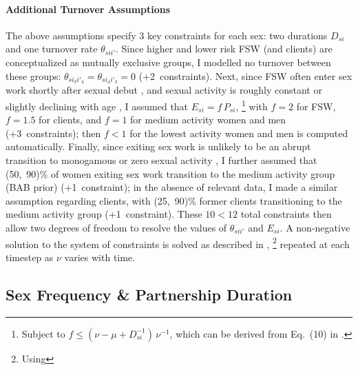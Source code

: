 \paragraph{Additional Turnover Assumptions}
The above assumptions specify 3 key constraints for each sex:
two durations $D_{si}$ and one turnover rate $\theta_{sii'}$.
Since higher and lower risk FSW (and clients) are conceptualized as mutually exclusive groups,
I modelled no turnover between these groups:
$\theta_{si_{3}i'_{4}} = \theta_{si_{4}i'_{3}} = 0$ (+2~constraints).
Next, since FSW often enter sex work shortly after sexual debut \cite{Cheuk2020,Ma2020},
and sexual activity is roughly constant or slightly declining with age \cite{Todd2009},
I assumed that $E_{si} = f\,P_{si}$,%
\footnote{Subject to $f \le (\nu - \mu + D_{si}^{-1})\,\nu^{-1}$,
  which can be derived from Eq.~(10) in \cite{Knight2020}.}
with $f = 2$ for FSW, $f = 1.5$ for clients,
and $f = 1$ for medium activity women and men (+3~constraints);
then $f < 1$ for the lowest activity women and men is computed automatically.
Finally, since exiting sex work is unlikely to be
an abrupt transition to monogamous or zero sexual activity \cite{Scorgie2012,Learmonth2015},
I further assumed that (50,~90)\% of women exiting sex work
transition to the medium activity group (BAB prior) (+1~constraint);
in the absence of relevant data, I made a similar assumption regarding clients,
with (25,~90)\% former clients transitioning to the medium activity group (+1~constraint).
These $10 < 12$ total constraints then allow two degrees of freedom to resolve
the values of $\theta_{sii'}$ and $E_{si}$.
A non-negative solution to the system of constraints is solved as described in \cite{Knight2020},%
\footnote{Using }
repeated at each timestep as $\nu$ varies with time.
\subsection{Sex Frequency \& Partnership Duration}\label{model.par.sex}
